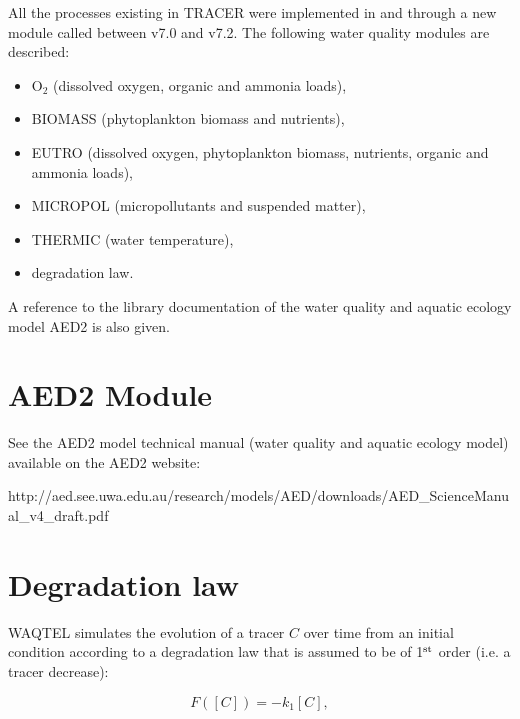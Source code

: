 \documentclass[Waqtel]{../../data/TelemacDoc} %
\begin{document}
All the processes existing in TRACER were implemented in  and  through
a new module called \waqtel between v7.0 and v7.2.
The following water quality modules are described:
\begin{itemize}
\item O$_2$ (dissolved oxygen, organic and ammonia loads),
\item BIOMASS (phytoplankton biomass and nutrients),
\item EUTRO (dissolved oxygen, phytoplankton biomass, nutrients, organic and ammonia loads),
\item MICROPOL (micropollutants and suspended matter),
\item THERMIC (water temperature),
\item degradation law.
\end{itemize}
A reference to the library documentation of the water quality and aquatic ecology model
AED2 is also given.

\newpage














\chapter{AED2 Module}

See the AED2 model technical manual (water quality and aquatic ecology model)
available on the AED2 website:

http://aed.see.uwa.edu.au/research/models/AED/downloads/AED\_ScienceManual\_v4\_draft.pdf


\chapter{Degradation law}

WAQTEL simulates the evolution of a tracer $C$ over time from an initial condition
according to a degradation law that is assumed to be of 1$^{\rm{st}}$ order (i.e. a tracer decrease):

\begin{equation}
  F([C]) = -k_1 [C],
\end{equation}
\end{document}
